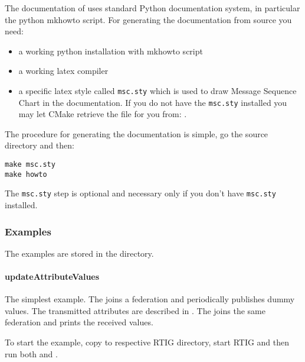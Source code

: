 \documentclass[12pt,a4paper]{howto}
\begin{document}
The documentation of  uses standard Python documentation
system, in particular the python mkhowto script.
For generating the documentation from source you need:
\begin{itemize}
  \item a working python installation with mkhowto script
  \item a working latex compiler
  \item a specific latex style called \texttt{msc.sty} which is used
        to draw Message Sequence Chart in the documentation.
        If you do not have the \texttt{msc.sty} installed you may
        let CMake retrieve the file for you from:        
        .
\end{itemize}

The procedure for generating the documentation is simple,
go the  source directory and then:
\begin{verbatim}
make msc.sty
make howto
\end{verbatim}

The \texttt{msc.sty} step is optional and necessary only if you don't have
\texttt{msc.sty} installed.

\subsubsection{Examples}

The  examples are stored in the 
directory.

\paragraph{updateAttributeValues}
The simplest  example. The
joins a federation and periodically publishes dummy values. The transmitted attributes
are described in
.
The
joins the same federation and prints the received values.

To start the example, copy  to respective RTIG directory, start RTIG
and then run both  and .
\end{document}
